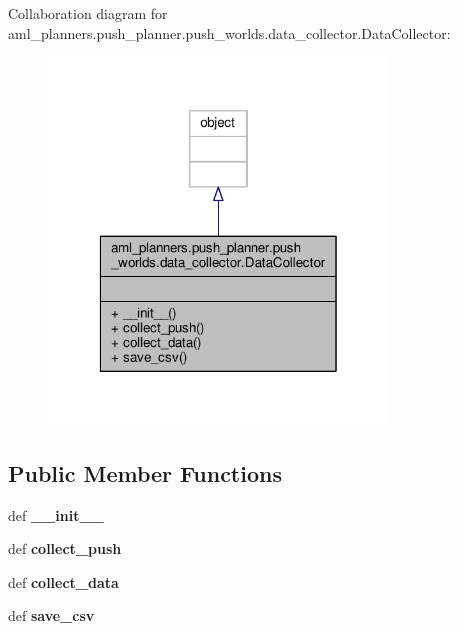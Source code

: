 Collaboration diagram for aml\-\_\-planners.\-push\-\_\-planner.\-push\-\_\-worlds.\-data\-\_\-collector.\-Data\-Collector\-:
\nopagebreak
\begin{figure}[H]
\begin{center}
\leavevmode
\includegraphics[width=256pt]{classaml__planners_1_1push__planner_1_1push__worlds_1_1data__collector_1_1_data_collector__coll__graph}
\end{center}
\end{figure}
\subsection*{Public Member Functions}
\begin{DoxyCompactItemize}
\item 
\hypertarget{classaml__planners_1_1push__planner_1_1push__worlds_1_1data__collector_1_1_data_collector_a86fd32e75f37821ed8ad6ff8b8e32e9b}{def {\bfseries \-\_\-\-\_\-init\-\_\-\-\_\-}}\label{classaml__planners_1_1push__planner_1_1push__worlds_1_1data__collector_1_1_data_collector_a86fd32e75f37821ed8ad6ff8b8e32e9b}

\item 
\hypertarget{classaml__planners_1_1push__planner_1_1push__worlds_1_1data__collector_1_1_data_collector_a002d570ea57f311e7ce76bd69eb5bc02}{def {\bfseries collect\-\_\-push}}\label{classaml__planners_1_1push__planner_1_1push__worlds_1_1data__collector_1_1_data_collector_a002d570ea57f311e7ce76bd69eb5bc02}

\item 
\hypertarget{classaml__planners_1_1push__planner_1_1push__worlds_1_1data__collector_1_1_data_collector_a3c24be2cd11e1775647048c1081a483c}{def {\bfseries collect\-\_\-data}}\label{classaml__planners_1_1push__planner_1_1push__worlds_1_1data__collector_1_1_data_collector_a3c24be2cd11e1775647048c1081a483c}

\item 
\hypertarget{classaml__planners_1_1push__planner_1_1push__worlds_1_1data__collector_1_1_data_collector_aba3ef12124528c6bca247a8fe1c93e16}{def {\bfseries save\-\_\-csv}}\label{classaml__planners_1_1push__planner_1_1push__worlds_1_1data__collector_1_1_data_collector_aba3ef12124528c6bca247a8fe1c93e16}

\end{DoxyCompactItemize}


